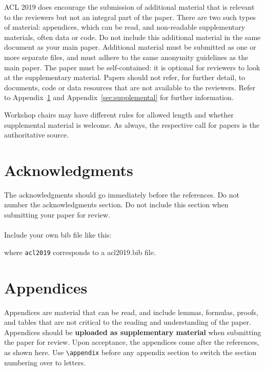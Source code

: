 \documentclass[11pt,a4paper]{article}
\begin{document}
ACL 2019 does encourage the submission of additional material that is relevant to the reviewers but not an integral part of the paper. There are two such types of material: appendices, which can be read, and non-readable supplementary materials, often data or code.  Do not include this additional material in the same document as your main paper. Additional material must be submitted as one or more separate files, and must adhere to the same anonymity guidelines as the main paper. The paper must be self-contained: it is optional for reviewers to look at the supplementary material. Papers should not refer, for further detail, to documents, code or data resources that are not available to the reviewers. Refer to Appendix~\ref{sec:appendix} and Appendix~\ref{sec:supplemental} for further information. 

Workshop chairs may have different rules for allowed length and
whether supplemental material is welcome. As always, the respective
call for papers is the authoritative source.

\section*{Acknowledgments}

The acknowledgments should go immediately before the references.  Do
not number the acknowledgments section. Do not include this section
when submitting your paper for review. \\

 \\
Include your own bib file like this:
\verb||
\verb|| 

where \verb|acl2019| corresponds to a acl2019.bib file.



\appendix

\section{Appendices}
\label{sec:appendix}
Appendices are material that can be read, and include lemmas, formulas, proofs, and tables that are not critical to the reading and understanding of the paper. 
Appendices should be {\bf uploaded as supplementary material} when submitting the paper for review. Upon acceptance, the appendices come after the references, as shown here. Use
\verb|\appendix| before any appendix section to switch the section
numbering over to letters.
\end{document}
